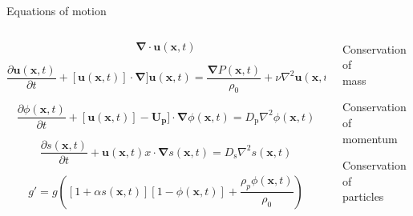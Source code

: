 \documentclass[final]{beamer} %
\begin{document}
\begin{frame}[t]
\begin{columns}[t]
\begin{column}{0.6\paperwidth}
      \begin{block}{Equations of motion}

        \begin{columns}[t]

          \begin{column}{0.3\paperwidth}
            $$ \mathbf{\nabla} \cdot \mathbf{u}(\mathbf{x}, t) $$

            $$ \frac{\partial \mathbf{u}(\mathbf{x}, t)}{\partial t} +
            [\mathbf{u}(\mathbf{x}, t)] \cdot \mathbf{\nabla}]
              \mathbf{u}(\mathbf{x}, t) =
              \frac{\mathbf{\nabla} P(\mathbf{x}, t)}{\rho_{0}} +
              \nu \nabla^{2} \mathbf{u}(\mathbf{x}, t) - g'\mathbf{\hat{z}} $$

              $$ \frac{\partial \phi(\mathbf{x}, t)}{\partial t} +
              [\mathbf{u}(\mathbf{x}, t)] - \mathbf{U_{\text{p}}}] \cdot
                \mathbf{\nabla} \phi(\mathbf{x}, t) =
                D_{\text{p}} \nabla^{2} \phi(\mathbf{x}, t) $$

                $$ \frac{\partial s(\mathbf{x}, t)}{\partial t} +
                \mathbf{u}(\mathbf{x}, t)x \cdot \mathbf{\nabla} s(\mathbf{x}, t) =
                D_{\text{s}} \nabla^{2} s(\mathbf{x}, t) $$

                $$ g' = g \left( [1 + \alpha s(\mathbf{x}, t)] [1 - \phi(\mathbf{x}, t)]
                + \frac{\rho_{p} \phi(\mathbf{x}, t)}{\rho_{0}} \right) $$

          \end{column}

          \begin{column}{0.07\paperwidth}

            \centering

            \vspace{-0.5cm}

            Conservation of \\ mass \\

            \vspace{0.7cm}

            Conservation of \\ momentum \\

            \vspace{0.7cm}

            Conservation of \\ particles \\


\end{column}
\end{columns}
\end{block}
\end{column}
\end{columns}
\end{frame}
\end{document}
